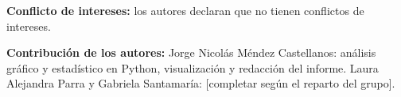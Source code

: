 \documentclass[twoside,twocolumn,10pt]{article}
\begin{document}
\textbf{Conflicto de intereses: } los autores declaran que no tienen conflictos de intereses.

\textbf{Contribuci\'on de los autores:}
Jorge Nicol\'as M\'endez Castellanos: an\'alisis gr\'afico y estad\'istico en Python, visualizaci\'on y redacci\'on del informe. Laura Alejandra Parra y Gabriela Santamar\'ia: [completar seg\'un el reparto del grupo].


\printbibliography  %
\end{document}

